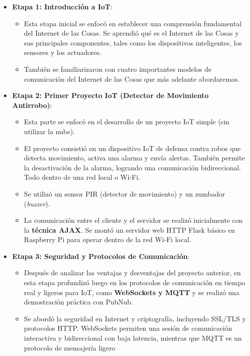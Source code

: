 \documentclass{report}
\begin{document}
\begin{itemize}
    \item \textbf{Etapa 1: Introducción a IoT}:
    \begin{itemize}
        \item Esta etapa inicial se enfocó en establecer una comprensión fundamental del Internet de las Cosas. Se aprendió qué 
        es el Internet de las Cosas y sus principales componentes, tales como los dispositivos inteligentes, los sensores y los 
        actuadores.
        \item También se familiarizaron con cuatro importantes modelos de comunicación del Internet de las Cosas que más adelante
        abordaremos.
    \end{itemize}
    \item \textbf{Etapa 2: Primer Proyecto IoT (Detector de Movimiento Antirrobo)}:
    \begin{itemize}
        \item Esta parte se enfocó en el desarrollo de un proyecto IoT simple (sin utilizar la nube).
        \item El proyecto consistió en un dispositivo IoT de defensa contra robos que detecta movimiento, 
        activa una alarma y envía alertas. También permite la desactivación de la alarma, logrando una comunicación bidireccional.
        Todo dentro de una red local o Wi-Fi.
        \item Se utilizó un sensor PIR (detector de movimiento) y un zumbador (\textit{buzzer}).
        \item La comunicación entre el cliente y el servidor se realizó inicialmente con la \textbf{técnica AJAX}. Se montó un 
        servidor web HTTP Flask básico en Raspberry Pi para operar dentro de la red Wi-Fi local.
    \end{itemize}
    \item \textbf{Etapa 3: Seguridad y Protocolos de Comunicación}:
    \begin{itemize}
        \item Después de analizar las ventajas y desventajas del proyecto anterior, en esta etapa profundizó luego en los 
        protocolos de comunicación en tiempo real y ligeros para IoT, como \textbf{WebSockets y MQTT} y se realizó una 
        demostración práctica con PubNub.
        \item Se abordó la seguridad en Internet y criptografía, incluyendo SSL/TLS y protocolos HTTP. WebSockets permiten una 
        sesión de comunicación interactiva y bidireccional con baja latencia, mientras que MQTT es un protocolo de mensajería ligero 

\end{itemize}
\end{itemize}
\end{document}
